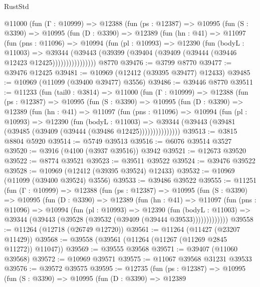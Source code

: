 \begin{lexlean}{RustStd}
\begin{coremodule}
      @11000
        (fun (Γ : @10999) =>
        @12388
          (fun (ps : @12387) =>
          @10995
            (fun (S : @3390) =>
            @10995
              (fun (D : @3390) =>
              @12389
                (fun (hn : @41) =>
                @11097
                  (fun (pns : @11096) =>
                  @10994
                    (fun (pl : @10993) =>
                    @12390
                      (fun (bodyL : @11003) =>
                      @39344
                        (@39443
                          (@39399 (@39404 (@39409 (@39444 (@39446 @12423 @12425))))))))))))))))
    @8770
@39476 := @3799 @8770
@39477 := @39476 @12425
@39481 := @10969 (@12412 (@39395 @39477) @12433)
@39485 := @10969 (@11099 (@39400 @39477) @3556)
@39486 := @39446 @8770
@39511 := @11233
    (fun (tail0 : @3814) =>
    @11000
      (fun (Γ : @10999) =>
      @12388
        (fun (ps : @12387) =>
        @10995
          (fun (S : @3390) =>
          @10995
            (fun (D : @3390) =>
            @12389
              (fun (hn : @41) =>
              @11097
                (fun (pns : @11096) =>
                @10994
                  (fun (pl : @10993) =>
                  @12390
                    (fun (bodyL : @11003) =>
                    @39344 (@39443 (@39481 (@39485 (@39409 (@39444 (@39486 @12425)))))))))))))))
@39513 := @3815 @8804 @5920
@39514 := @5749 @39513
@39516 := @6076 @39514 @3527
@39520 := @3916 (@4100 (@3937 @39516)) @3942
@39521 := @12673 @39520
@39522 := @8774 @39521
@39523 := @39511 @39522
@39524 := @39476 @39522
@39528 := @10969 (@12412 (@39395 @39524) @12433)
@39532 := @10969 (@11099 (@39400 @39524) @3556)
@39533 := @39486 @39522
@39555 := @11251
    (fun (Γ : @10999) =>
    @12388
      (fun (ps : @12387) =>
      @10995
        (fun (S : @3390) =>
        @10995
          (fun (D : @3390) =>
          @12389
            (fun (hn : @41) =>
            @11097
              (fun (pns : @11096) =>
              @10994
                (fun (pl : @10993) =>
                @12390
                  (fun (bodyL : @11003) =>
                  @39344 (@39443 (@39528 (@39532 (@39409 (@39444 @39533)))))))))))))
@39558 := @11264 (@12718 (@26749 @12720))
@39561 := @11264 (@11427 (@23207 @11429))
@39568 := @39558 (@39561 (@11264 (@11267 (@11269 @2845 @11272)) @11047))
@39569 := @39555 @39568
@39571 := @39407 (@11060 @39568)
@39572 := @10969 @39571
@39575 := @11067 @39568 @31231 @39533
@39576 := @39572 @39575
@39595 := @12735
    (fun (ps : @12387) =>
    @10995
      (fun (S : @3390) =>
      @10995
        (fun (D : @3390) =>
        @12389

\end{coremodule}
\end{lexlean}
